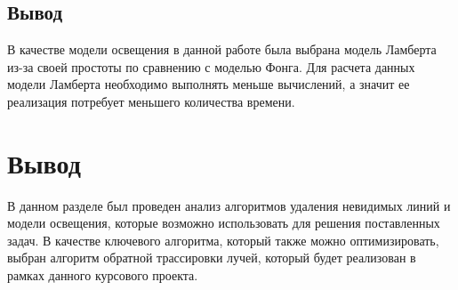 \subsection{Вывод}
В качестве модели освещения в данной работе была выбрана модель Ламберта из-за своей простоты по сравнению с моделью Фонга. Для расчета данных модели Ламберта необходимо выполнять меньше вычислений, а значит ее реализация потребует меньшего количества времени.

\section{Вывод}
В данном разделе был проведен анализ алгоритмов удаления невидимых линий и модели освещения, которые возможно использовать для решения поставленных задач. В качестве ключевого алгоритма, который также можно оптимизировать, выбран алгоритм обратной трассировки лучей, который будет реализован в рамках данного курсового проекта.

